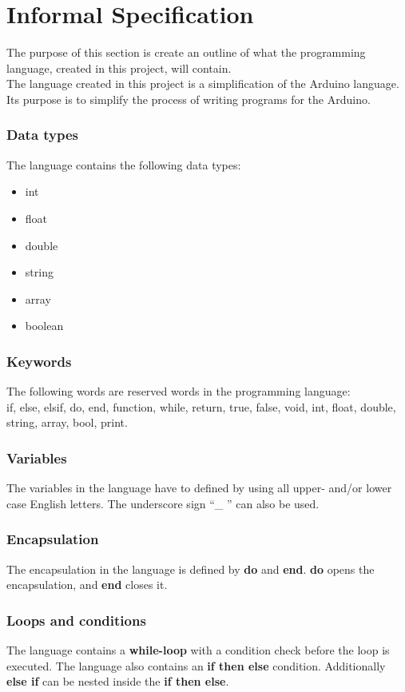 \chapter{Informal Specification}\label{analysis:informal-specification}
The purpose of this section is create an outline of what the programming language, created in this project, will contain.
\\The language created in this project is a simplification of the Arduino language. Its purpose is to simplify the process of writing programs for the Arduino.   

\subsection{Data types}
The language contains the following data types: 
\begin{itemize}
\item int
\item float
\item double
\item string
\item array
\item boolean
\end{itemize}

\subsection{Keywords}
The following words are reserved words in the programming language:\\
if, else, elsif, do, end, function, while, return, true, false, void, int, float, double, string, array, bool, print.

\subsection{Variables}
The variables in the language have to defined by using all upper- and/or lower case English letters. The underscore sign ``\_ '' can also be used. 

\subsection{Encapsulation}
The encapsulation in the language is defined by \textbf{do} and \textbf{end}. \textbf{do} opens the encapsulation, and \textbf{end} closes it.   

\subsection{Loops and conditions}
The language contains a \textbf{while-loop} with a condition check before the loop is executed. The language also contains an \textbf{if then else} condition. Additionally \textbf{else if} can be nested inside the \textbf{if then else}.   

